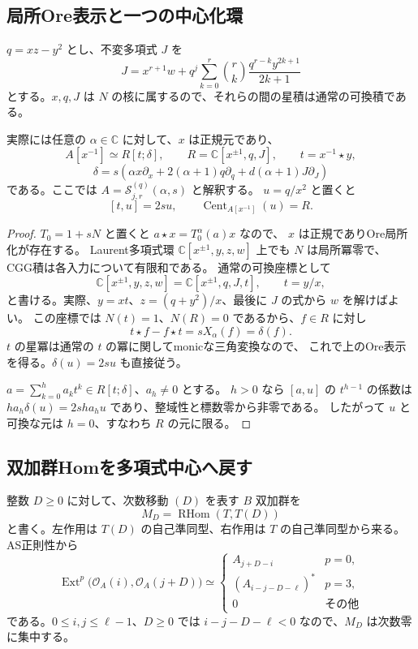 \subsection{局所Ore表示と一つの中心化環}

$q=xz-y^2$ とし、不変多項式 $J$ を
\[
 J=x^{r+1}w+q^j\sum_{k=0}^{r}
       \binom rk\frac{q^{r-k}y^{2k+1}}{2k+1}
\]
とする。$x,q,J$ は $N$ の核に属するので、それらの間の星積は通常の可換積である。

\begin{lemma}[局所Ore表示]
\label{lem:ore-centralizer-v35}
実際には任意の $\alpha\in\mathbb C$ に対して、$x$ は正規元であり、
\[
 A[x^{-1}]
 \simeq R[t;\delta],\qquad
 R=\mathbb C[x^{\pm1},q,J],\qquad t=x^{-1}\star y,
\]
\[
 \delta=s\left(\alpha x\partial_x
              +2(\alpha+1)q\partial_q
              +d(\alpha+1)J\partial_J\right)
\]
である。ここでは $A=\mathcal S_{j,r}^{(q)}(\alpha,s)$ と解釈する。
$u=q/x^2$ と置くと
\[
 [t,u]=2su,\qquad
 \operatorname{Cent}_{A[x^{-1}]}(u)=R.
\]
\end{lemma}

\begin{proof}
$T_0=1+sN$ と置くと $a\star x=T_0^\alpha(a)x$ なので、
$x$ は正規でありOre局所化が存在する。
Laurent多項式環 $\mathbb C[x^{\pm1},y,z,w]$ 上でも $N$ は局所冪零で、
CGG積は各入力について有限和である。
通常の可換座標として
\[
 \mathbb C[x^{\pm1},y,z,w]
 =\mathbb C[x^{\pm1},q,J,t],\qquad t=y/x,
\]
と書ける。実際、$y=xt$、$z=(q+y^2)/x$、最後に $J$ の式から $w$ を解けばよい。
この座標では $N(t)=1$、$N(R)=0$ であるから、$f\in R$ に対し
\[
 t\star f-f\star t=sX_\alpha(f)=\delta(f).
\]
$t$ の星冪は通常の $t$ の冪に関してmonicな三角変換なので、
これで上のOre表示を得る。$\delta(u)=2su$ も直接従う。

$a=\sum_{k=0}^{h}a_kt^k\in R[t;\delta]$、$a_h\ne0$ とする。
$h>0$ なら $[a,u]$ の $t^{h-1}$ の係数は
$h a_h\delta(u)=2sh a_hu$ であり、整域性と標数零から非零である。
したがって $u$ と可換な元は $h=0$、すなわち $R$ の元に限る。
\end{proof}

\subsection{双加群Homを多項式中心へ戻す}

整数 $D\ge0$ に対して、次数移動 $(D)$ を表す $B$ 双加群を
\[
 M_D=\operatorname{RHom}(T,T(D))
\]
と書く。左作用は $T(D)$ の自己準同型、右作用は $T$ の自己準同型から来る。
AS正則性から
\[
 \operatorname{Ext}^p\bigl(\mathcal O_A(i),\mathcal O_A(j+D)\bigr)
 \simeq
 \begin{cases}
 A_{j+D-i}&p=0,\\
 (A_{i-j-D-\ell})^*&p=3,\\
 0&\text{その他}
 \end{cases}
\]
である。$0\le i,j\le\ell-1$、$D\ge0$ では
$i-j-D-\ell<0$ なので、$M_D$ は次数零に集中する。

